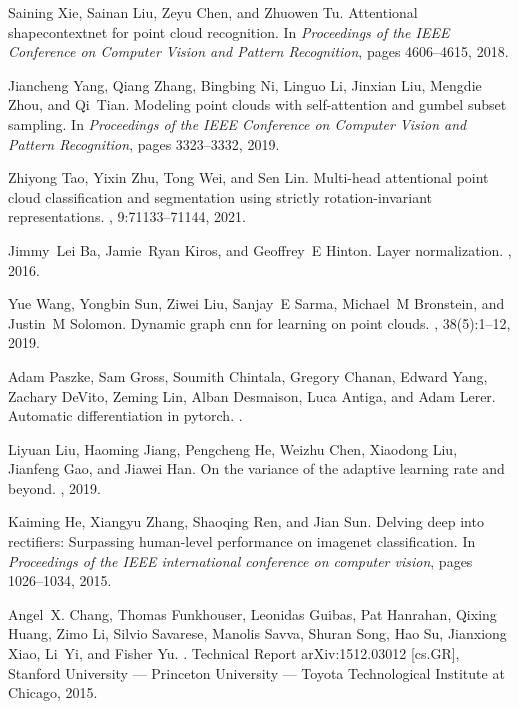 \documentclass{ieeeaccess}
\begin{document}
\begin{thebibliography}{10}
Saining Xie, Sainan Liu, Zeyu Chen, and Zhuowen Tu.
\newblock Attentional shapecontextnet for point cloud recognition.
\newblock In {\em Proceedings of the IEEE Conference on Computer Vision and
  Pattern Recognition}, pages 4606--4615, 2018.

Jiancheng Yang, Qiang Zhang, Bingbing Ni, Linguo Li, Jinxian Liu, Mengdie Zhou,
  and Qi~Tian.
\newblock Modeling point clouds with self-attention and gumbel subset sampling.
\newblock In {\em Proceedings of the IEEE Conference on Computer Vision and
  Pattern Recognition}, pages 3323--3332, 2019.

Zhiyong Tao, Yixin Zhu, Tong Wei, and Sen Lin.
\newblock Multi-head attentional point cloud classification and segmentation
  using strictly rotation-invariant representations.
, 9:71133--71144, 2021.

Jimmy~Lei Ba, Jamie~Ryan Kiros, and Geoffrey~E Hinton.
\newblock Layer normalization.
, 2016.

Yue Wang, Yongbin Sun, Ziwei Liu, Sanjay~E Sarma, Michael~M Bronstein, and
  Justin~M Solomon.
\newblock Dynamic graph cnn for learning on point clouds.
, 38(5):1--12, 2019.

Adam Paszke, Sam Gross, Soumith Chintala, Gregory Chanan, Edward Yang, Zachary
  DeVito, Zeming Lin, Alban Desmaison, Luca Antiga, and Adam Lerer.
\newblock Automatic differentiation in pytorch.
.

Liyuan Liu, Haoming Jiang, Pengcheng He, Weizhu Chen, Xiaodong Liu, Jianfeng
  Gao, and Jiawei Han.
\newblock On the variance of the adaptive learning rate and beyond.
, 2019.

Kaiming He, Xiangyu Zhang, Shaoqing Ren, and Jian Sun.
\newblock Delving deep into rectifiers: Surpassing human-level performance on
  imagenet classification.
\newblock In {\em Proceedings of the IEEE international conference on computer
  vision}, pages 1026--1034, 2015.

Angel~X. Chang, Thomas Funkhouser, Leonidas Guibas, Pat Hanrahan, Qixing Huang,
  Zimo Li, Silvio Savarese, Manolis Savva, Shuran Song, Hao Su, Jianxiong Xiao,
  Li~Yi, and Fisher Yu.
.
\newblock Technical Report arXiv:1512.03012 [cs.GR], Stanford University ---
  Princeton University --- Toyota Technological Institute at Chicago, 2015.


\end{thebibliography}
\end{document}
